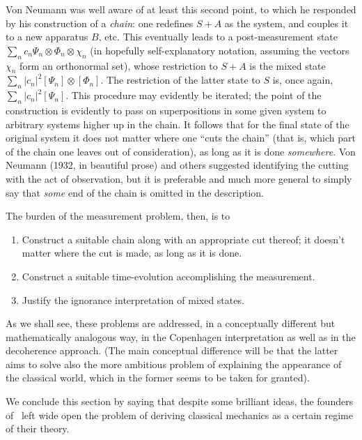 \documentclass[12pt,titlepage]{article}
\newcommand{\ot}{\otimes}
\newcommand{\ch}{\chi} \newcommand{\ps}{\psi} \newcommand{\Ps}{\Psi}
\begin{document}
Von Neumann was well aware of at least this second point, to which he responded by his construction of a {\it chain}: one redefines $S+A$ as the system, and couples it to a new apparatus $B$, etc. This eventually leads to a post-measurement state $\sum_n c_n \Psi_n \ot\Phi_n\ot \ch_n$ (in hopefully self-explanatory notation, assuming the vectors $\ch_n$ form an orthonormal set), whose restriction to $S+A$ is the mixed
state  $\sum_n |c_n|^2 [\Psi_n]\ot [\Phi_n]$.
The restriction of the latter state to $S$ is, once again, $\sum_n |c_n|^2  [\Psi_n]$. This procedure may evidently be iterated; the point of the construction is evidently to pass on superpositions in some given system to arbitrary systems higher up in the chain.
It follows that for the final state of the original system it does not matter where one ``cuts the chain'' (that is, which part of  the chain one leaves out of consideration), as long as it is done {\it somewhere}. Von Neumann (1932, in beautiful prose) and others suggested identifying the cutting with the act of observation, but it is preferable and much more general to  simply say that {\it some} end of the chain is omitted in the description. 

The burden of the  measurement problem, then, is to \begin{enumerate}
\item Construct a suitable chain along with an appropriate cut thereof;  it doesn't matter where the cut is made, as long as it is done.
\item Construct a suitable time-evolution accomplishing the measurement.
 \item Justify the  ignorance interpretation of mixed states. 
\end{enumerate}
As we shall see, these problems are addressed, in a conceptually different but mathematically analogous way, in the 
Copenhagen interpretation as well as in the decoherence approach.
(The main conceptual difference will be that the latter aims to solve also the more ambitious problem of explaining the appearance of the classical world, which in the former seems to be taken for granted). 
\bigskip

We conclude this section by saying that despite some brilliant ideas, the founders of \qm\ left  wide open the problem of deriving classical mechanics as a certain regime of their theory. 
\end{document}
